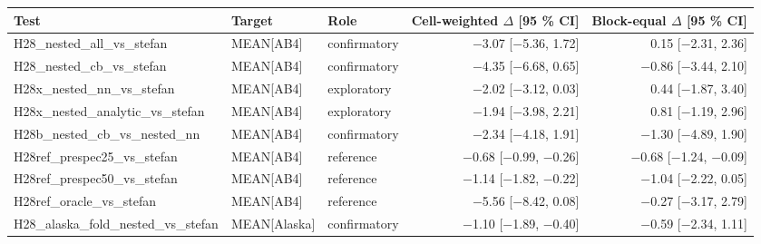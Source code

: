 \begin{tabular}{lllrr}
\toprule
Test & Target & Role & Cell-weighted $\Delta$ [95 \% CI] & Block-equal $\Delta$ [95 \% CI] \\
\midrule
H28\_nested\_all\_vs\_stefan & MEAN[AB4] & confirmatory & $-$3.07 [$-$5.36, 1.72] & 0.15 [$-$2.31, 2.36] \\
H28\_nested\_cb\_vs\_stefan & MEAN[AB4] & confirmatory & $-$4.35 [$-$6.68, 0.65] & $-$0.86 [$-$3.44, 2.10] \\
H28x\_nested\_nn\_vs\_stefan & MEAN[AB4] & exploratory & $-$2.02 [$-$3.12, 0.03] & 0.44 [$-$1.87, 3.40] \\
H28x\_nested\_analytic\_vs\_stefan & MEAN[AB4] & exploratory & $-$1.94 [$-$3.98, 2.21] & 0.81 [$-$1.19, 2.96] \\
H28b\_nested\_cb\_vs\_nested\_nn & MEAN[AB4] & confirmatory & $-$2.34 [$-$4.18, 1.91] & $-$1.30 [$-$4.89, 1.90] \\
H28ref\_prespec25\_vs\_stefan & MEAN[AB4] & reference & $-$0.68 [$-$0.99, $-$0.26] & $-$0.68 [$-$1.24, $-$0.09] \\
H28ref\_prespec50\_vs\_stefan & MEAN[AB4] & reference & $-$1.14 [$-$1.82, $-$0.22] & $-$1.04 [$-$2.22, 0.05] \\
H28ref\_oracle\_vs\_stefan & MEAN[AB4] & reference & $-$5.56 [$-$8.42, 0.08] & $-$0.27 [$-$3.17, 2.79] \\
H28\_alaska\_fold\_nested\_vs\_stefan & MEAN[Alaska] & confirmatory & $-$1.10 [$-$1.89, $-$0.40] & $-$0.59 [$-$2.34, 1.11] \\
\bottomrule
\end{tabular}
